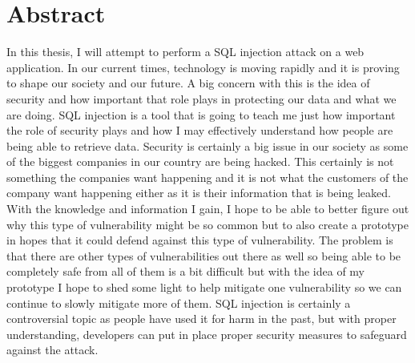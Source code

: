 \chapter*{Abstract} 

In this thesis, I will attempt to perform a SQL injection attack on a web application. In our current times, technology is moving rapidly and it is proving to shape our society and our future. A big concern with this is the idea of security and how important that role plays in protecting our data and what we are doing. SQL injection is a tool that is going to teach me just how important the role of security plays and how I may effectively understand how people are being able to retrieve data. Security is certainly a big issue in our society as some of the biggest companies in our country are being hacked. This certainly is not something the companies want happening and it is not what the customers of the company want happening either as it is their information that is being leaked. With the knowledge and information I gain, I hope to be able to better figure out why this type of vulnerability might be so common but to also create a prototype in hopes that it could defend against this type of vulnerability. The problem is that there are other types of vulnerabilities out there as well so being able to be completely safe from all of them is a bit difficult but with the idea of my prototype I hope to shed some light to help mitigate one vulnerability so we can continue to slowly mitigate more of them. SQL injection is certainly a controversial topic as people have used it for harm in the past, but with proper understanding, developers can put in place proper security measures to safeguard against the attack.